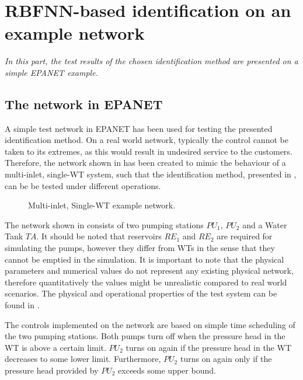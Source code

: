 \chapter{RBFNN-based identification on an example network}
\label{NN_based_example}

\emph{In this part, the test results of the chosen identification method are presented on a simple EPANET example. }

\section{The network in EPANET}
\label{example1_EPANET}

A simple test network in EPANET has been used for testing the presented identification method. On a real world network, typically the control cannot be taken to its extremes, as this would result in undesired service to the customers. Therefore, the network shown in  has been created to mimic the behaviour of a multi-inlet, single-WT system, such that the identification method, presented in , can be be tested under different operations. 

\begin{figure}[H]
\centering
 
\caption{Multi-inlet, Single-WT example network.}
\label{fig:epanet_example1_id}
\end{figure}
\vspace{-3mm}

The network shown in  consists of two pumping stations $PU_1$, $PU_2$ and a Water Tank $TA$. It should be noted that reservoirs $RE_1$ and $RE_2$ are required for simulating the pumps, however they differ from WTs in the sense that they cannot be emptied in the simulation. It is important to note that the physical parameters and numerical values do not represent any existing physical network, therefore quantitatively the values might be unrealistic compared to real world scenarios. The physical and operational properties of the test system can be found in .

The controls implemented on the network are based on simple time scheduling of the two pumping stations. Both pumps turn off when the pressure head in the WT is above a certain limit. $PU_2$ turns on again if the pressure head in the WT decreases to some lower limit. Furthermore, $PU_2$ turns on again only if the pressure head provided by $PU_2$ exceeds some upper bound. 

